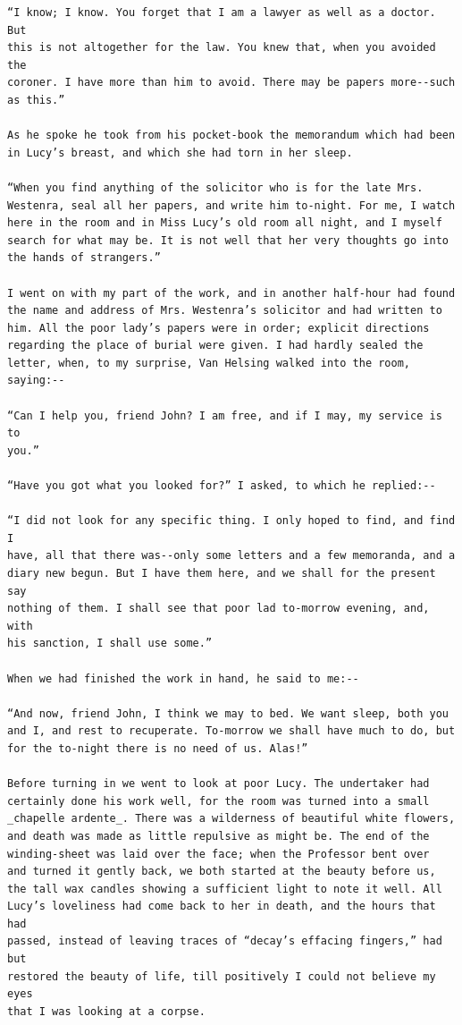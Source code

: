 \documentclass{article}
\begin{document}
\begin{verbatim}
“I know; I know. You forget that I am a lawyer as well as a doctor. But
this is not altogether for the law. You knew that, when you avoided the
coroner. I have more than him to avoid. There may be papers more--such
as this.”

As he spoke he took from his pocket-book the memorandum which had been
in Lucy’s breast, and which she had torn in her sleep.

“When you find anything of the solicitor who is for the late Mrs.
Westenra, seal all her papers, and write him to-night. For me, I watch
here in the room and in Miss Lucy’s old room all night, and I myself
search for what may be. It is not well that her very thoughts go into
the hands of strangers.”

I went on with my part of the work, and in another half-hour had found
the name and address of Mrs. Westenra’s solicitor and had written to
him. All the poor lady’s papers were in order; explicit directions
regarding the place of burial were given. I had hardly sealed the
letter, when, to my surprise, Van Helsing walked into the room,
saying:--

“Can I help you, friend John? I am free, and if I may, my service is to
you.”

“Have you got what you looked for?” I asked, to which he replied:--

“I did not look for any specific thing. I only hoped to find, and find I
have, all that there was--only some letters and a few memoranda, and a
diary new begun. But I have them here, and we shall for the present say
nothing of them. I shall see that poor lad to-morrow evening, and, with
his sanction, I shall use some.”

When we had finished the work in hand, he said to me:--

“And now, friend John, I think we may to bed. We want sleep, both you
and I, and rest to recuperate. To-morrow we shall have much to do, but
for the to-night there is no need of us. Alas!”

Before turning in we went to look at poor Lucy. The undertaker had
certainly done his work well, for the room was turned into a small
_chapelle ardente_. There was a wilderness of beautiful white flowers,
and death was made as little repulsive as might be. The end of the
winding-sheet was laid over the face; when the Professor bent over
and turned it gently back, we both started at the beauty before us,
the tall wax candles showing a sufficient light to note it well. All
Lucy’s loveliness had come back to her in death, and the hours that had
passed, instead of leaving traces of “decay’s effacing fingers,” had but
restored the beauty of life, till positively I could not believe my eyes
that I was looking at a corpse.


\end{verbatim}
\end{document}
